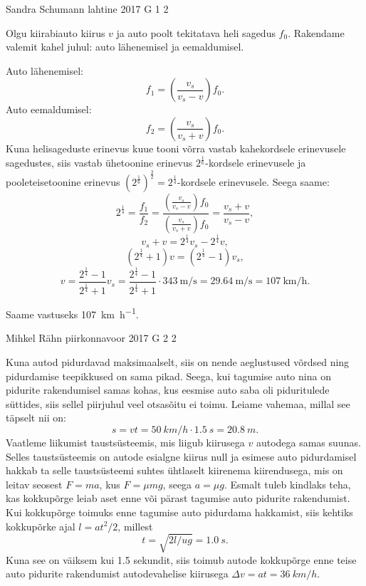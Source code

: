 \documentclass[11pt, twoside]{article}
\begin{document}
{%
{Sandra Schumann} %
{lahtine} %
{2017} %
{G 1} %
{2} %
{

\ifSolution
Olgu kiirabiauto kiirus $v$ ja auto poolt tekitatava heli sagedus $f_0$. Rakendame valemit kahel juhul: auto lähenemisel ja eemaldumisel.

Auto lähenemisel:
\[f_1 = \left(\frac{v_s}{v_s - v}\right)f_0.\]
Auto eemaldumisel:
\[f_2 = \left(\frac{v_s}{v_s + v}\right)f_0.\]
Kuna helisageduste erinevus kuue tooni võrra vastab kahekordsele erinevusele sagedustes, siis vastab ühetoonine erinevus $2^{\frac 1 6}$-kordsele erinevusele ja pooleteisetoonine erinevus $\left(2^{\frac 1 6}\right)^{\frac 3 2} = 2^{\frac 1 4}$-kordsele erinevusele. Seega saame:
\[2^{\frac 1 4} = \frac{f_1}{f_2} = \frac{(\frac{v_s}{v_s - v})f_0}{(\frac{v_s}{v_s + v})f_0} = \frac{v_s + v}{v_s - v},\]
\[v_s + v = 2^{\frac 1 4}v_s - 2^{\frac 1 4}v,\]
\[(2^{\frac 1 4} + 1)v = (2^{\frac 1 4} - 1)v_s,\]
\[v = \frac{2^{\frac 1 4} - 1}{2^{\frac 1 4} + 1}v_s = \frac{2^{\frac 1 4} - 1}{2^{\frac 1 4} + 1} \cdot \SI{343}{\meter\per\second} = \SI{29.64}{\meter\per\second} = \SI{107}{\kilo\meter\per\hour}. \]

Saame vastuseks \SI{107}{\kilo\meter\per\hour}.
\fi
}

{Mihkel Rähn} %
{piirkonnavoor} %
{2017} %
{G 2} %
{2} %
{

\ifSolution
\osa Kuna autod pidurdavad maksimaalselt, siis on nende aeglustused võrdsed ning pidurdamise teepikkused on sama pikad. Seega, kui tagumise auto nina on pidurite rakendumisel samas kohas, kus eesmise auto saba oli piduritulede süttides, siis sellel piirjuhul veel otsasõitu ei toimu. Leiame vahemaa, millal see täpselt nii on:
\[
s=vt=\SI{50}{km/h}\cdot\SI{1,5}{s}=\SI{20,8}{m}.
\]
\osa Vaatleme liikumist taustsüsteemis, mis liigub kiirusega $v$ autodega samas suunas. Selles taustsüsteemis on autode esialgne kiirus null ja esimese auto pidurdamisel hakkab ta selle taustsüsteemi suhtes ühtlaselt kiirenema kiirendusega, mis on leitav seosest $F=ma$, kus $F=\mu mg$, seega $a=\mu g$. Esmalt tuleb kindlaks teha, kas kokkupõrge leiab aset enne või pärast tagumise auto pidurite rakendumist. Kui kokkupõrge toimuks enne tagumise auto pidurdama hakkamist, siis kehtiks kokkupõrke ajal $l=at^2/2$, millest
\[
t=\sqrt{2l/ug}=\SI{1.0}{s}.
\]
Kuna see on väiksem kui \num{1,5} sekundit, siis toimub autode kokkupõrge enne teise auto pidurite rakendumist autodevahelise kiirusega $\Delta v=at=\SI{36}{km/h}$.
\fi
}

}
\end{document}
